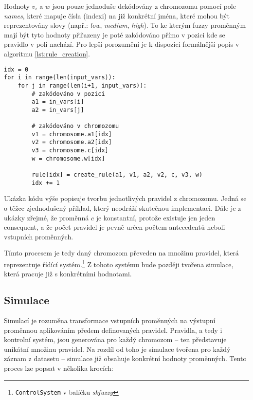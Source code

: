 \documentclass{article}
\begin{document}
Hodnoty $v_i$ a $w$ jsou pouze jednoduše dekódovány z chromozomu pomocí pole \emph{names}, které mapuje čísla (indexi) na již konkrétní jména, které mohou být reprezentovány slovy (např.: \emph{low}, \emph{medium}, \emph{high}). To ke kterým fuzzy proměnným mají být tyto hodnoty přiřazeny je poté zakódováno přímo v pozici kde se pravidlo v poli nachází. Pro lepší porozumění je k dispozici formálnější popis v algoritmu \ref{lst:rule_creation}.

\begin{listing}[h]
\begin{verbatim}
idx = 0
for i in range(len(input_vars)):
    for j in range(len(i+1, input_vars)):
        # zakódováno v pozici
        a1 = in_vars[i]
        a2 = in_vars[j]

        # zakódováno v chromozomu
        v1 = chromosome.a1[idx]
        v2 = chromosome.a2[idx]
        v3 = chromosome.c[idx]
        w = chromosome.w[idx]

        rule[idx] = create_rule(a1, v1, a2, v2, c, v3, w)
        idx += 1
\end{verbatim}
\caption{Ukázka kódu výše popisuje tvorbu jednotlivých pravidel z chromozomu. Jedná se o těžce zjednodušený příklad, který neodráží skutečnou implementaci. Dále je z ukázky zřejmé, že proměnná $c$ je konstantní, protože existuje jen jeden consequent, a že počet pravidel je pevně určen počtem antecedentů neboli vstupních proměnných.}
\label{lst:rule_creation}
\end{listing}

Tímto procesem je tedy daný chromozom převeden na množinu pravidel, která reprezentuje řídící systém.\footnote{\texttt{ControlSystem} v balíčku \emph{skfuzzy}} Z tohoto systému bude později tvořena simulace, která pracuje již s konkrétními hodnotami.

\subsection{Simulace}

Simulací je rozuměna transformace vstupních proměnných na výstupní proměnnou aplikováním předem definovaných pravidel. Pravidla, a tedy i kontrolní systém, jsou generována pro každý chromozom -- ten představuje unikátní množinu pravidel. Na rozdíl od toho je simulace tvořena pro každý záznam z datasetu -- simulace již obsahuje konkrétní hodnoty proměnných. Tento proces lze popsat v několika krocích:
\end{document}
